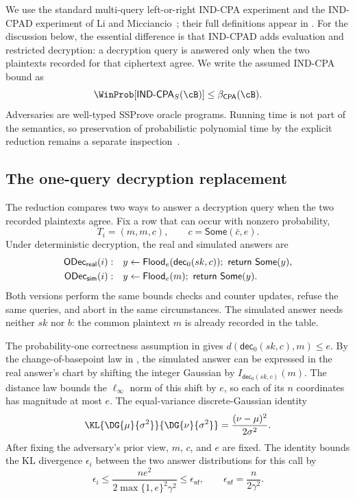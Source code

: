 We use the standard multi-query left-or-right IND-CPA experiment and the
IND-CPAD experiment of Li and Micciancio~\cite{lm}; their full definitions
appear in .
For the discussion below, the essential difference is that IND-CPAD adds
evaluation and restricted decryption: a decryption query is answered only
when the two plaintexts recorded for that ciphertext agree.
We write the assumed IND-CPA bound as
\[
 \WinProb[\mathsf{IND\text{-}CPA}_{S}(\cB)]
 \leq \beta_{\mathsf{CPA}}(\cB).
\]
Adversaries are well-typed SSProve oracle programs.  Running time is not part
of the semantics, so preservation of probabilistic polynomial time by the
explicit reduction remains a separate inspection~\cite{ssprove}.

\subsection{The one-query decryption replacement}
\label{sec:simulation-target}

The reduction compares two ways to answer a decryption query when the two
recorded plaintexts agree.
Fix a row that can occur with nonzero probability,
\[
 T_i=(m,m,c),
 \qquad c=\mathsf{Some}(\bar c,e).
\]
Under deterministic decryption, the real and simulated answers are
\begin{align}
\label{eq:real-sim-decrypt}
 \mathsf{ODec}_{\mathsf{real}}(i):\quad&
   y\leftarrow\mathsf{Flood}_e(\mathsf{dec}_0(sk,c));
   \ \mathsf{return}\ \mathsf{Some}(y),\notag\\
 \mathsf{ODec}_{\mathsf{sim}}(i):\quad&
   y\leftarrow\mathsf{Flood}_e(m);
   \ \mathsf{return}\ \mathsf{Some}(y).
\end{align}
Both versions perform the same bounds checks and counter updates, refuse the
same queries, and abort in the same circumstances.
The simulated answer needs neither \(sk\) nor \(b\): the common plaintext
\(m\) is already recorded in the table.

The probability-one correctness assumption in 
gives
\(d(\mathsf{dec}_0(sk,c),m)\leq e\).
By the change-of-basepoint law in , the simulated answer can
be expressed in the real answer's chart by shifting the integer Gaussian by
\(I_{\mathsf{dec}_0(sk,c)}(m)\).
The distance law bounds the \(\ell_\infty\) norm of this shift by \(e\), so
each of its \(n\) coordinates has magnitude at most \(e\).
The equal-variance discrete-Gaussian identity
\begin{equation}
\label{eq:dg-kl}
 \KL{\DG{\mu}{\sigma^2}}{\DG{\nu}{\sigma^2}}
   =\frac{(\nu-\mu)^2}{2\sigma^2}.
\end{equation}
After fixing the adversary's prior view, \(m\), \(c\), and \(e\) are fixed.
The identity bounds the KL divergence \(\epsilon_i\) between the two answer
distributions for this call by
\begin{equation}
\label{eq:epsilon-nf}
 \epsilon_i
 \leq
 \frac{ne^2}{2\max\{1,e\}^2\gamma^2}
 \leq
 \epsilon_{\mathsf{nf}},
 \qquad
\epsilon_{\mathsf{nf}}=\frac{n}{2\gamma^2}.
\end{equation}

